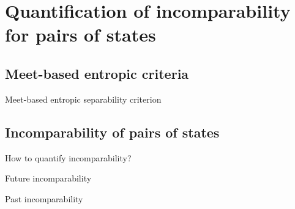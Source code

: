 \section{Quantification of incomparability for pairs of states}

\subsection{Meet-based entropic criteria}

\begin{frame}{Meet-based entropic separability criterion}
    
\end{frame}

\subsection{Incomparability of pairs of states}

\begin{frame}{How to quantify incomparability?}
    
\end{frame}

\begin{frame}{Future incomparability}
    
\end{frame}

\begin{frame}{Past incomparability}
    
\end{frame}

